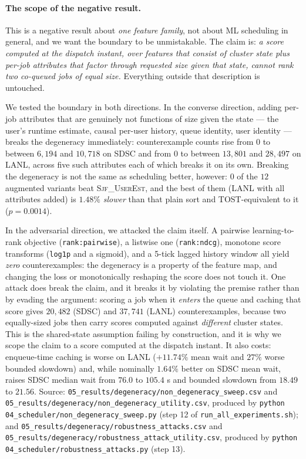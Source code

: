 \documentclass[11pt,twocolumn]{article}
\begin{document}
\paragraph{The scope of the negative result.}
\label{sec:scope}
This is a negative result about \emph{one feature family}, not about ML
scheduling in general, and we want the boundary to be unmistakable. The claim is:
\emph{a score computed at the dispatch instant, over features that consist of
cluster state plus per-job attributes that factor through requested size given
that state, cannot rank two co-queued jobs of equal size.} Everything outside
that description is untouched.

We tested the boundary in both directions. In the converse direction, adding
per-job attributes that are genuinely not functions of size given the state ---
the user's runtime estimate, causal per-user history, queue identity, user
identity --- breaks the degeneracy immediately: counterexample counts rise from
$0$ to between $6{,}194$ and $10{,}718$ on SDSC and from $0$ to between
$13{,}801$ and $28{,}497$ on LANL, across five such attributes each of which
breaks it on its own. Breaking the degeneracy is not the same as scheduling
better, however: $0$ of the $12$ augmented variants beat \textsc{Sjf\_UserEst},
and the best of them (LANL with all attributes added) is $1.48\%$ \emph{slower}
than that plain sort and TOST-equivalent to it ($p = 0.0014$).

In the adversarial direction, we attacked the claim itself. A pairwise
learning-to-rank objective (\texttt{rank:pairwise}), a listwise one
(\texttt{rank:ndcg}), monotone score transforms (\texttt{log1p} and a sigmoid),
and a 5-tick lagged history window all yield \emph{zero} counterexamples: the
degeneracy is a property of the feature map, and changing the loss or
monotonically reshaping the score does not touch it. One attack does break the
claim, and it breaks it by violating the premise rather than by evading the
argument: scoring a job when it \emph{enters} the queue and caching that score
gives $20{,}482$ (SDSC) and $37{,}741$ (LANL) counterexamples, because two
equally-sized jobs then carry scores computed against \emph{different} cluster
states. This is the shared-state assumption failing by construction, and it is
why we scope the claim to a score computed at the dispatch instant. It also
costs: enqueue-time caching is worse on LANL ($+11.74\%$ mean wait and $27\%$
worse bounded slowdown) and, while nominally $1.64\%$ better on SDSC mean wait,
raises SDSC median wait from $76.0$ to $105.4$ s and bounded slowdown from
$18.49$ to $21.56$.
{\small Source:
\texttt{05\_results/degeneracy/non\_degeneracy\_sweep.csv} and
\texttt{05\_results/degeneracy/non\_degeneracy\_utility.csv}, produced by
\texttt{python 04\_scheduler/non\_degeneracy\_sweep.py} (step 12 of
\texttt{run\_all\_experiments.sh}); and
\texttt{05\_results/degeneracy/robustness\_attacks.csv} and
\texttt{05\_results/degeneracy/robustness\_attack\_utility.csv}, produced by
\texttt{python 04\_scheduler/robustness\_attacks.py} (step 13).}
\end{document}
